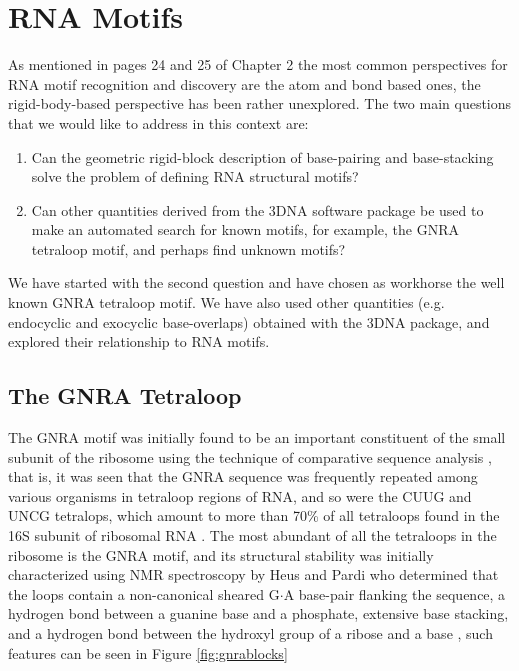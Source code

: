 \chapter{RNA Motifs}
\label{motifs} 

As  mentioned  in  pages 24  and  25  of  Chapter  2 the  most  common
perspectives for RNA motif recognition  and discovery are the atom and
bond  based ones,  the  rigid-body-based perspective  has been  rather
unexplored.  The two  main questions that we would  like to address in
this context are:

\begin{enumerate}
\item{Can  the geometric rigid-block  description of  base-pairing and
  base-stacking solve the problem of defining RNA structural motifs?}
\item{Can other  quantities derived from the 3DNA  software package be
  used to make an automated search for known motifs, for example, the
  GNRA tetraloop motif, and perhaps find unknown motifs?}
\end{enumerate}

We have started with the  second question and have chosen as workhorse
the  well  known  GNRA  tetraloop  motif.  We  have  also  used  other
quantities  (e.g.  endocyclic  and  exocyclic base-overlaps)  obtained
with  the  3DNA \cite{lu2003,  lu2008b}  package,  and explored  their
relationship to RNA motifs.

\section{The GNRA Tetraloop}
The GNRA motif  was initially found to be  an important constituent of
the small subunit  of the ribosome using the  technique of comparative
sequence analysis \cite{woese1990}, that is, it was seen that the GNRA
sequence was frequently repeated  among various organisms in tetraloop
regions of RNA, and so were  the CUUG and UNCG tetralops, which amount
to  more than  70\% of  all  tetraloops found  in the  16S subunit  of
ribosomal RNA \cite{woese1990, depaul2010}.   The most abundant of all
the tetraloops in  the ribosome is the GNRA  motif, and its structural
stability was  initially characterized using NMR  spectroscopy by Heus
and  Pardi \cite{heus1991}  who determined  that the  loops  contain a
non-canonical  sheared G$\cdot$A  base-pair flanking  the  sequence, a
hydrogen bond between  a guanine base and a  phosphate, extensive base
stacking, and a  hydrogen bond between the hydroxyl  group of a ribose
and  a base  \cite{heUs1991},  such  features can  be  seen in  Figure
\ref{fig:gnrablocks}

